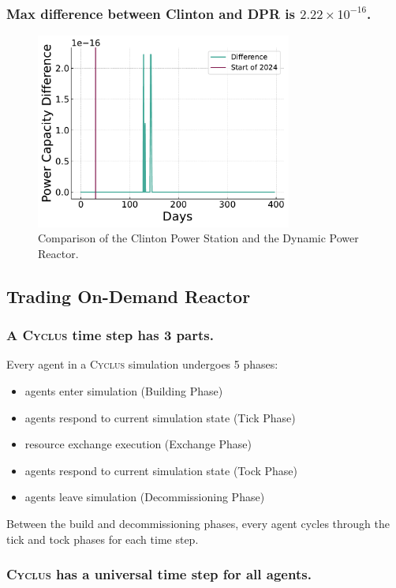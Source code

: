 \documentclass[9pt]{beamer}
\newcommand{\cyclus}{\textsc{Cyclus}\xspace}
\begin{document}
\begin{frame}
  \frametitle{Max difference between Clinton and DPR is $2.22 \times 10^{-16}$.}
  \begin{figure}
    \centering
    \includegraphics[width=0.75\textwidth]{images/dpr_diff.pdf}
    \caption{Comparison of the Clinton Power Station and the Dynamic Power Reactor.}
  \end{figure}
\end{frame}


\subsection{Trading On-Demand Reactor}
\begin{frame}
  \frametitle{A \cyclus time step has 3 parts.}
  Every agent in a \cyclus simulation undergoes 5 phases:
  \begin{itemize}
    \item agents enter simulation (Building Phase)
    \item agents respond to current simulation state (Tick Phase)
    \item resource exchange execution (Exchange Phase)
    \item agents respond to current simulation state (Tock Phase)
    \item agents leave simulation (Decommissioning Phase)
  \end{itemize}
  Between the build and decommissioning phases, every agent cycles through the tick and tock phases for each time step.
\end{frame}

\begin{frame}
  \frametitle{\cyclus has a universal time step for all agents.}

\end{frame}
\end{document}
